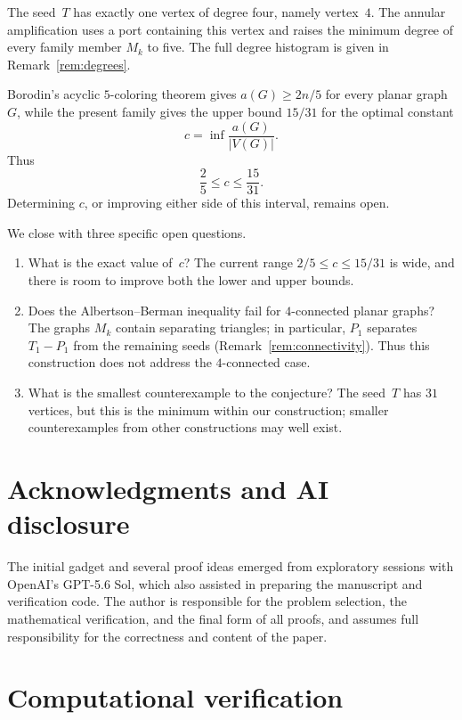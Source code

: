 \documentclass[11pt]{article}
\theoremstyle{definition}
\theoremstyle{remark}
\begin{document}
The seed~$T$ has exactly one vertex of degree four, namely vertex~$4$.  The
annular amplification uses a port containing this vertex and raises the
minimum degree of every family member $M_k$ to five.  The full degree histogram
is given in Remark~\ref{rem:degrees}.

Borodin's acyclic $5$-coloring theorem gives $a(G)\ge2n/5$ for every planar
graph~$G$, while the present family gives the upper bound $15/31$ for the
optimal constant
\[
 c=\inf\frac{a(G)}{|V(G)|}.
\]
Thus
\[
 \frac25\le c\le\frac{15}{31}.
\]
Determining $c$, or improving either side of this interval, remains open.

We close with three specific open questions.

\begin{enumerate}
\item What is the exact value of~$c$?  The current range
      $2/5\le c\le 15/31$ is wide, and there is room to improve both the
      lower and upper bounds.

\item Does the Albertson--Berman inequality fail for $4$-connected planar
      graphs?  The graphs $M_k$ contain separating triangles; in particular,
      $P_1$ separates $T_1-P_1$ from the remaining seeds
      (Remark~\ref{rem:connectivity}).  Thus this construction does not
      address the $4$-connected case.

\item What is the smallest counterexample to the conjecture?  The seed~$T$
      has $31$ vertices, but this is the minimum within our construction;
      smaller counterexamples from other constructions may well exist.
\end{enumerate}

\section{Acknowledgments and AI disclosure}

The initial gadget and several proof ideas emerged from exploratory sessions 
with OpenAI's GPT-5.6 Sol, which also assisted in preparing the manuscript 
and verification code. The author is responsible for the problem selection, 
the mathematical verification, and the final form of all proofs, and assumes 
full responsibility for the correctness and content of the paper.

\appendix
\section{Computational verification}\label{app:verification}
\end{document}

